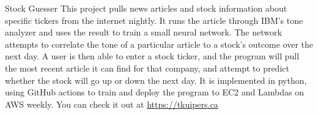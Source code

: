 
\begin{cventries}
    \cventry 
        {}
        {Stock Guesser}
        {}
        {}
        {
            This project pulls news articles and stock information about specific tickers from the internet nightly.  
            It runs the article through IBM's tone analyzer and uses the result to train a small neural network.  
            The network attempts to correlate the tone of a particular article to a stock's outcome over the next day.  
            A user is then able to enter a stock ticker, and the program will pull the most recent article it can find 
            for that company, and attempt to predict whether the stock will go up or down the next day.
            \linebreak
            \linebreak
            It is implemented in python, using GitHub actions to train and deploy the program to EC2 and Lambdas on AWS weekly.
            You can check it out at \url{https://tkuipers.ca}
        }
    
\end{cventries}